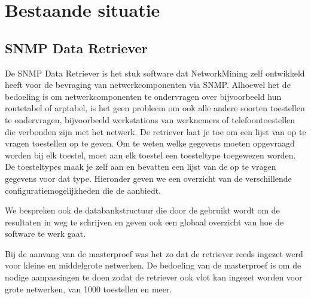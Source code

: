 \chapter{Bestaande situatie}


\section{SNMP Data Retriever}
\label{snmp-data-retriever}
De SNMP Data Retriever is het stuk software dat NetworkMining zelf ontwikkeld heeft voor de bevraging van netwerkcomponenten via SNMP.
Alhoewel het de bedoeling is om netwerkcomponenten te ondervragen over bijvoorbeeld hun routetabel of \gls{arptabel},
is het geen probleem om ook alle andere soorten toestellen te ondervragen, bijvoorbeeld werkstations van werknemers of
telefoontoestellen die verbonden zijn met het netwerk. De retriever laat je toe om een lijst van op te vragen toestellen op te geven.
Om te weten welke gegevens moeten opgevraagd worden bij elk toestel, moet aan elk toestel een toesteltype toegewezen worden.
De toesteltypes maak je zelf aan en bevatten een lijst van de op te vragen gegevens voor dat type.
Hieronder geven we een overzicht van de verschillende configuratiemogelijkheden die de \nwmretriever{} aanbiedt.

We bespreken ook de databankstructuur die door de \nwmretriever{} gebruikt wordt om de resultaten in weg te schrijven
en geven ook een globaal overzicht van hoe de software te werk gaat.

Bij de aanvang van de masterproef was het zo dat de retriever reeds ingezet werd voor kleine en middelgrote netwerken.
De bedoeling van de masterproef is om de nodige aanpassingen te doen zodat de retriever ook vlot kan ingezet worden voor grote netwerken,
van 1000 toestellen en meer.



